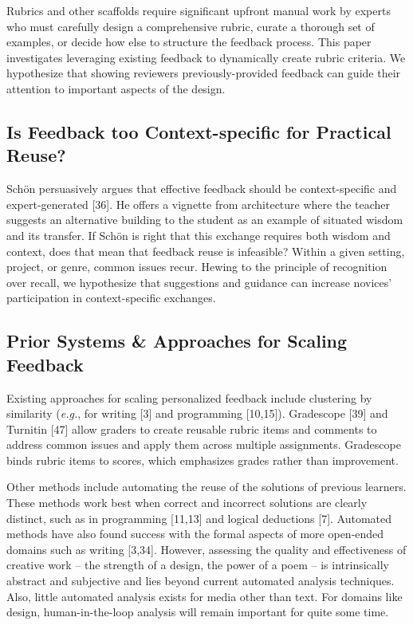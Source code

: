 Rubrics and other scaffolds require significant upfront manual work by experts who must carefully design a comprehensive rubric, curate a thorough set of examples, or decide how else to structure the feedback process. This paper investigates leveraging existing feedback to dynamically create rubric criteria. We hypothesize that showing reviewers previously-provided feedback can guide their attention to important aspects of the design. 
\subsection{Is Feedback too Context-specific for Practical Reuse?}
Schön persuasively argues that effective feedback should be context-specific and expert-generated [36]. He offers a vignette from architecture where the teacher suggests an alternative building to the student as an example of situated wisdom and its transfer. If Schön is right that this exchange requires both wisdom and context, does that mean that feedback reuse is infeasible? Within a given setting, project, or genre, common issues recur. Hewing to the principle of recognition over recall, we hypothesize that suggestions and guidance can increase novices' participation in context-specific exchanges. 

\subsection{Prior Systems \& Approaches for Scaling Feedback}
Existing approaches for scaling personalized feedback include clustering by similarity (\textit{e.g.}, for writing [3] and programming [10,15]). Gradescope [39] and Turnitin [47] allow graders to create reusable rubric items and comments to address common issues and apply them across multiple assignments. Gradescope binds rubric items to scores, which emphasizes grades rather than improvement. 

Other methods include automating the reuse of the solutions of previous learners. These methods work best when correct and incorrect solutions are clearly distinct, such as in programming [11,13] and logical deductions [7]. Automated methods have also found success with the formal aspects of more open-ended domains such as writing [3,34].  However, assessing the quality and effectiveness of creative work – the strength of a design, the power of a poem – is intrinsically abstract and subjective and lies beyond current automated analysis techniques. Also, little automated analysis exists for media other than text. For domains like design, human-in-the-loop analysis will remain important for quite some time. 

